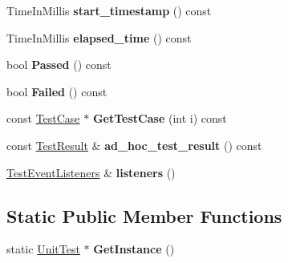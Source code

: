\begin{DoxyCompactItemize}
\item 
Time\+In\+Millis {\bfseries start\+\_\+timestamp} () const \hypertarget{classtesting_1_1UnitTest_adb9fdaf25b601f91bd55606941d05c80}{}\label{classtesting_1_1UnitTest_adb9fdaf25b601f91bd55606941d05c80}

\item 
Time\+In\+Millis {\bfseries elapsed\+\_\+time} () const \hypertarget{classtesting_1_1UnitTest_a87853e2fe9f0b172467534323cb9d267}{}\label{classtesting_1_1UnitTest_a87853e2fe9f0b172467534323cb9d267}

\item 
bool {\bfseries Passed} () const \hypertarget{classtesting_1_1UnitTest_a4ef49e958702bf741e7eaa4864e28a48}{}\label{classtesting_1_1UnitTest_a4ef49e958702bf741e7eaa4864e28a48}

\item 
bool {\bfseries Failed} () const \hypertarget{classtesting_1_1UnitTest_ad7711156d07d6037d8f497e5c385f78d}{}\label{classtesting_1_1UnitTest_ad7711156d07d6037d8f497e5c385f78d}

\item 
const \hyperlink{classtesting_1_1TestCase}{Test\+Case} $\ast$ {\bfseries Get\+Test\+Case} (int i) const \hypertarget{classtesting_1_1UnitTest_a7967986c217975d4de70739d28b4109d}{}\label{classtesting_1_1UnitTest_a7967986c217975d4de70739d28b4109d}

\item 
const \hyperlink{classtesting_1_1TestResult}{Test\+Result} \& {\bfseries ad\+\_\+hoc\+\_\+test\+\_\+result} () const \hypertarget{classtesting_1_1UnitTest_ab4ecadf87d00bc67d15553e2998ef81d}{}\label{classtesting_1_1UnitTest_ab4ecadf87d00bc67d15553e2998ef81d}

\item 
\hyperlink{classtesting_1_1TestEventListeners}{Test\+Event\+Listeners} \& {\bfseries listeners} ()\hypertarget{classtesting_1_1UnitTest_a1b7387b0b3daa2433ed6b685027bf285}{}\label{classtesting_1_1UnitTest_a1b7387b0b3daa2433ed6b685027bf285}

\end{DoxyCompactItemize}
\subsection*{Static Public Member Functions}
\begin{DoxyCompactItemize}
\item 
static \hyperlink{classtesting_1_1UnitTest}{Unit\+Test} $\ast$ {\bfseries Get\+Instance} ()\hypertarget{classtesting_1_1UnitTest_af254e2e695471eb9f128bc556bae3668}{}\label{classtesting_1_1UnitTest_af254e2e695471eb9f128bc556bae3668}

\end{DoxyCompactItemize}
